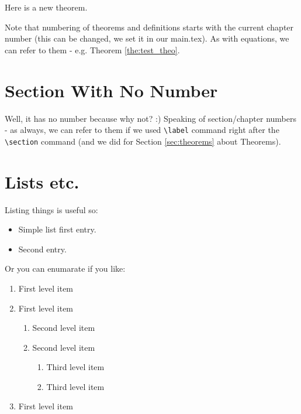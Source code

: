 \begin{thm} 
	\label{the:test_theo}
	Here is a new theorem.
\end{thm}

Note that numbering of theorems and definitions starts with the current chapter number (this can be changed, we set it in our main.tex). As with equations, we can refer to them - e.g. Theorem \ref{the:test_theo}.

\section*{Section With No Number}

Well, it has no number because why not? :) Speaking of section/chapter numbers - as always, we can refer to them if we used \verb|\label| command right after the \verb|\section| command (and we did for Section \ref{sec:theorems} about Theorems).

\section{Lists etc.}

Listing things is useful so:

\begin{itemize}
	\item Simple list first entry.
	\item Second entry.
\end{itemize}

Or you can enumarate if you like:

\begin{enumerate}
	\item First level item
	\item First level item
	\begin{enumerate}
		\item Second level item
		\item Second level item
		\begin{enumerate}
			\item Third level item
			\item Third level item
		\end{enumerate}
	\end{enumerate}
	\item First level item
\end{enumerate}

